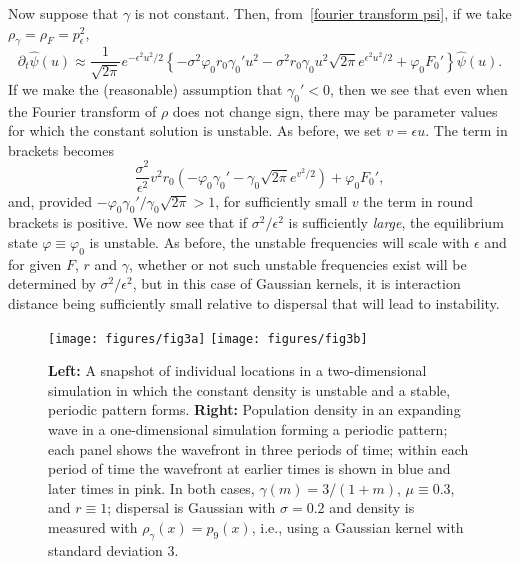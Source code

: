 \documentclass[EJP]{ejpecp} %
\renewcommand{\hat}{\widehat}
\begin{document}
Now suppose that $\gamma$ is not constant. Then, 
from~\eqref{fourier transform psi},
if we take 
$\rho_\gamma=\rho_F=p_\epsilon^2$,
\begin{equation*}
	\partial_t \hat \psi(u) \approx
    \frac{1}{\sqrt{2\pi}}
    e^{-\epsilon^2 u^2/2} 
	\left\{
		-\sigma^2 \varphi_0 r_0 \gamma_0' u^2
        -\sigma^2 r_0 \gamma_0 u^2 \sqrt{2\pi} e^{\epsilon^2 u^2/2}
        +\varphi_0 F_0'
	\right\}
	\hat{\psi}(u).
\end{equation*}
If we make the (reasonable)
assumption that $\gamma_0'<0$, then we see that even when the Fourier
transform of $\rho$ does not change sign, there may be parameter values
for which the constant solution is unstable.
As before, we set $v=\epsilon u$. The term in brackets becomes
\[
	\frac{\sigma^2}{\epsilon^2}v^2 r_0
    \left(
        -\varphi_0 \gamma_0' - \gamma_0 \sqrt{2\pi} e^{v^2/2}
    \right) + \varphi_0F_0',
\] 
and, provided $-\varphi_0\gamma_0'/\gamma_0\sqrt{2\pi} >1$, for sufficiently small $v$ 
the term in round brackets is positive. We now see that if 
$\sigma^2/\epsilon^2$ is sufficiently {\em large},
the equilibrium state $\varphi\equiv\varphi_0$ 
is unstable. As before, the unstable frequencies will scale with $\epsilon$
and for given $F$, $r$ and $\gamma$, whether or not such unstable
frequencies exist will be determined by $\sigma^2/\epsilon^2$, but 
in this case of Gaussian kernels, 
it is interaction distance being sufficiently small relative
to dispersal that will lead to instability.
	

\begin{figure}
    \begin{center}
        \texttt{[image: figures/fig3a]}
        \texttt{[image: figures/fig3b]}
    \end{center}
    \caption{
        \textbf{Left:} A snapshot of individual locations in a two-dimensional simulation
        in which the constant density is unstable
        and a stable, periodic pattern forms.
        \textbf{Right:} Population density in an expanding wave in a one-dimensional simulation
        forming a periodic pattern;
        each panel shows the wavefront in three periods of time;
        within each period of time the wavefront at earlier times is shown in blue
        and later times in pink.
        In both cases, $\gamma(m) = 3/(1 + m)$, $\mu \equiv 0.3$, and $r \equiv 1$;
        dispersal is Gaussian with $\sigma=0.2$ and density is measured with $\rho_\gamma(x) = p_9(x)$,
        i.e., using a Gaussian kernel with standard deviation 3.
        \label{fig:clumping}
    }
\end{figure}
\end{document}

